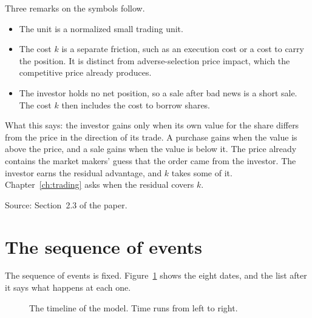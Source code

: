 Three remarks on the symbols follow.
\begin{itemize}
\item The unit is a normalized small trading unit.
\item The cost \(k\) is a separate friction, such as an execution cost or a cost to carry the position. It is distinct from adverse-selection price impact, which the competitive price already produces.
\item The investor holds no net position, so a sale after bad news is a short sale. The cost \(k\) then includes the cost to borrow shares.
\end{itemize}

What this says: the investor gains only when its own value for the share differs from the price in the direction of its trade.
A purchase gains when the value is above the price, and a sale gains when the value is below it.
The price already contains the market makers' guess that the order came from the investor. The investor earns the residual advantage, and \(k\) takes some of it.
Chapter~\ref{ch:trading} asks when the residual covers \(k\).

{\small\color{notegrey}Source: Section~2.3 of the paper.}

\section{The sequence of events}\label{sec:model-timing}

The sequence of events is fixed.
Figure~\ref{fig:model-timeline} shows the eight dates, and the list after it says what happens at each one.

\begin{figure}[tbp]
\centering
{}
\caption{The timeline of the model. Time runs from left to right.}\label{fig:model-timeline}
\end{figure}

